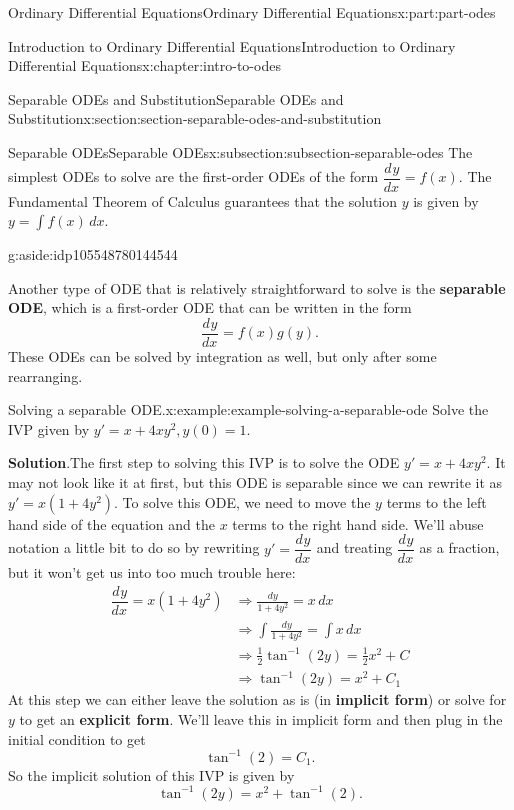 \documentclass[oneside,10pt,]{book}
\newcommand{\blocktitlefont}{\relax}
\newcommand{\terminology}[1]{\textbf{#1}}
\numberwithin{equation}{part}
\newcommand{\dv}[3][]{\dfrac{d^{#1} #2}{d #3^{#1}}}
\begin{document}
\begin{partptx}{Ordinary Differential Equations}{}{Ordinary Differential Equations}{}{}{x:part:part-odes}
\begin{chapterptx}{Introduction to Ordinary Differential Equations}{}{Introduction to Ordinary Differential Equations}{}{}{x:chapter:intro-to-odes}
\begin{sectionptx}{Separable ODEs and Substitution}{}{Separable ODEs and Substitution}{}{}{x:section:section-separable-odes-and-substitution}
\begin{subsectionptx}{Separable ODEs}{}{Separable ODEs}{}{}{x:subsection:subsection-separable-odes}
The simplest ODEs to solve are the first-order ODEs of the form \(\dv{y}{x} = f(x)\). The Fundamental Theorem of Calculus guarantees that the solution \(y\) is given by \(y = \int f(x)\,dx\).%
\begin{aside}{}{g:aside:idp105548780144544}%
\end{aside}
Another type of ODE that is relatively straightforward to solve is the \terminology{separable ODE}, which is a first-order ODE that can be written in the form%
%
\begin{equation*}
\dv{y}{x} = f(x)g(y).
\end{equation*}
These ODEs can be solved by integration as well, but only after some rearranging.%
\begin{example}{Solving a separable ODE.}{x:example:example-solving-a-separable-ode}%
Solve the IVP given by \(y' = x+4xy^{2}, y(0)=1\).%
\par\smallskip%
\noindent\textbf{\blocktitlefont Solution}.\hypertarget{g:solution:idp105548780148000}{}\quad{}The first step to solving this IVP is to solve the ODE \(y' = x+4xy^{2}\). It may not look like it at first, but this ODE is separable since we can rewrite it as \(y' = x(1+4y^{2})\). To solve this ODE, we need to move the \(y\) terms to the left hand side of the equation and the \(x\) terms to the right hand side. We'll abuse notation a little bit to do so by rewriting \(y' = \dv{y}{x}\) and treating \(\dv{y}{x}\) as a fraction, but it won't get us into too much trouble here:%
%
\begin{align*}
\dv{y}{x} = x(1+4y^{2}) &\Rightarrow \frac{dy}{1+4y^{2}} = x\,dx \\
&\Rightarrow \int\frac{dy}{1+4y^{2}}  = \int x\,dx \\
&\Rightarrow \frac{1}{2}\tan^{-1}(2y)  = \frac{1}{2}x^{2}+C \\
&\Rightarrow \tan^{-1}(2y)  = x^{2}+C_{1} 
\end{align*}
At this step we can either leave the solution as is (in \terminology{implicit form}) or solve for \(y\) to get an \terminology{explicit form}. We'll leave this in implicit form and then plug in the initial condition to get%
\begin{equation*}
\tan^{-1}(2) = C_{1}.
\end{equation*}
So the implicit solution of this IVP is given by%
\begin{equation*}
\tan^{-1}(2y) = x^{2}+\tan^{-1}(2).

\end{equation*}
\end{example}
\end{subsectionptx}
\end{sectionptx}
\end{chapterptx}
\end{partptx}
\end{document}
